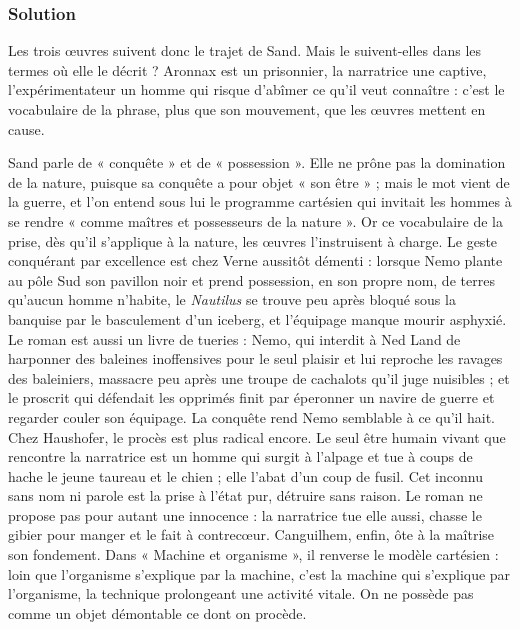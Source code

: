 \documentclass[11pt,a4paper]{article}
\begin{document}
\hypertarget{solution-5}{%
\subsubsection{Solution}\label{solution-5}}

Les trois œuvres suivent donc le trajet de Sand. Mais le suivent-elles dans les termes où elle le décrit ? Aronnax est un prisonnier, la narratrice une captive, l'expérimentateur un homme qui risque d'abîmer ce qu'il veut connaître : c'est le vocabulaire de la phrase, plus que son mouvement, que les œuvres mettent en cause.

Sand parle de « conquête » et de « possession ». Elle ne prône pas la domination de la nature, puisque sa conquête a pour objet « son être » ; mais le mot vient de la guerre, et l'on entend sous lui le programme cartésien qui invitait les hommes à se rendre « comme maîtres et possesseurs de la nature ». Or ce vocabulaire de la prise, dès qu'il s'applique à la nature, les œuvres l'instruisent à charge. Le geste conquérant par excellence est chez Verne aussitôt démenti : lorsque Nemo plante au pôle Sud son pavillon noir et prend possession, en son propre nom, de terres qu'aucun homme n'habite, le \emph{Nautilus} se trouve peu après bloqué sous la banquise par le basculement d'un iceberg, et l'équipage manque mourir asphyxié. Le roman est aussi un livre de tueries : Nemo, qui interdit à Ned Land de harponner des baleines inoffensives pour le seul plaisir et lui reproche les ravages des baleiniers, massacre peu après une troupe de cachalots qu'il juge nuisibles ; et le proscrit qui défendait les opprimés finit par éperonner un navire de guerre et regarder couler son équipage. La conquête rend Nemo semblable à ce qu'il hait. Chez Haushofer, le procès est plus radical encore. Le seul être humain vivant que rencontre la narratrice est un homme qui surgit à l'alpage et tue à coups de hache le jeune taureau et le chien ; elle l'abat d'un coup de fusil. Cet inconnu sans nom ni parole est la prise à l'état pur, détruire sans raison. Le roman ne propose pas pour autant une innocence : la narratrice tue elle aussi, chasse le gibier pour manger et le fait à contrecœur. Canguilhem, enfin, ôte à la maîtrise son fondement. Dans « Machine et organisme », il renverse le modèle cartésien : loin que l'organisme s'explique par la machine, c'est la machine qui s'explique par l'organisme, la technique prolongeant une activité vitale. On ne possède pas comme un objet démontable ce dont on procède.
\end{document}
